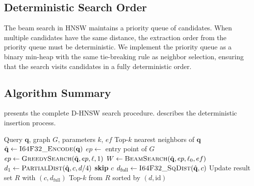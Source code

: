 \documentclass[10pt,journal]{IEEEtran}
\newcommand{\dhnsw}{\textsc{D-HNSW}}
\newcommand{\hnsw}{\textsc{HNSW}}
\begin{document}
\subsection{Deterministic Search Order}

The beam search in \hnsw{} maintains a priority queue of candidates. When multiple candidates have the same distance, the extraction order from the priority queue must be deterministic. We implement the priority queue as a binary min-heap with the same tie-breaking rule as neighbor selection, ensuring that the search visits candidates in a fully deterministic order.

\subsection{Algorithm Summary}

 presents the complete \dhnsw{} search procedure.  describes the deterministic insertion process.

\begin{algorithm}[t]
  \caption{\dhnsw{} Deterministic Search}
  \label{alg:dhnsw_search}
  \begin{algorithmic}[1]
    \REQUIRE Query $\mathbf{q}$, graph $G$, parameters $k$, $ef$
    \ENSURE Top-$k$ nearest neighbors of $\mathbf{q}$
    \STATE $\hat{\mathbf{q}} \leftarrow \textsc{I64F32\_Encode}(\mathbf{q})$
    \STATE $ep \leftarrow$ entry point of $G$
      \STATE $ep \leftarrow \textsc{GreedySearch}(\hat{\mathbf{q}}, ep, \ell, 1)$
    \ENDFOR
    \STATE $W \leftarrow \textsc{BeamSearch}(\hat{\mathbf{q}}, ep, \ell_0, ef)$
      \STATE $d_1 \leftarrow \textsc{PartialDist}(\hat{\mathbf{q}}, c, d/4)$
        \STATE \textbf{skip} $c$ 
      \ELSE
        \STATE $d_{\text{full}} \leftarrow \textsc{I64F32\_SqDist}(\hat{\mathbf{q}}, c)$
        \STATE Update result set $R$ with $(c, d_{\text{full}})$
      \ENDIF
    \ENDFOR
    \RETURN Top-$k$ from $R$ sorted by $(d, \text{id})$
  \end{algorithmic}
\end{algorithm}
\end{document}

